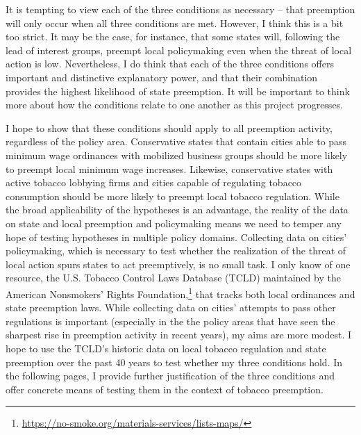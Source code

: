 \documentclass[12pt]{article}
\begin{document}
It is tempting to view each of the three conditions as necessary -- that preemption will only occur when all three conditions are met. However, I think this is a bit too strict. It may be the case, for instance, that some states will, following the lead of interest groups, preempt local policymaking even when the threat of local action is low. Nevertheless, I do think that each of the three conditions offers important and distinctive explanatory power, and that their combination provides the highest likelihood of state preemption. It will be important to think more about how the conditions relate to one another as this project progresses.

I hope to show that these conditions should apply to all preemption activity, regardless of the policy area. Conservative states that contain cities able to pass minimum wage ordinances with mobilized business groups should be more likely to preempt local minimum wage increases. Likewise, conservative states with active tobacco lobbying firms and cities capable of regulating tobacco consumption should be more likely to preempt local tobacco regulation. While the broad applicability of the hypotheses is an advantage, the reality of the data on state and local preemption and policymaking means we need to temper any hope of testing hypotheses in multiple policy domains. Collecting data on cities' policymaking, which is necessary to test whether the realization of the threat of local action spurs states to act preemptively, is no small task. I only know of one resource, the U.S. Tobacco Control Laws Database (TCLD) maintained by the American Nonsmokers' Rights Foundation,\footnote{\url{https://no-smoke.org/materials-services/lists-maps/}} that tracks both local ordinances and state preemption laws. While collecting data on cities' attempts to pass other regulations is important (especially in the the policy areas that have seen the sharpest rise in preemption activity in recent years), my aims are more modest. I hope to use the TCLD's historic data on local tobacco regulation and state preemption over the past 40 years to test whether my three conditions hold. In the following pages, I provide further justification of the three conditions and offer concrete means of testing them in the context of tobacco preemption. 
\end{document}
